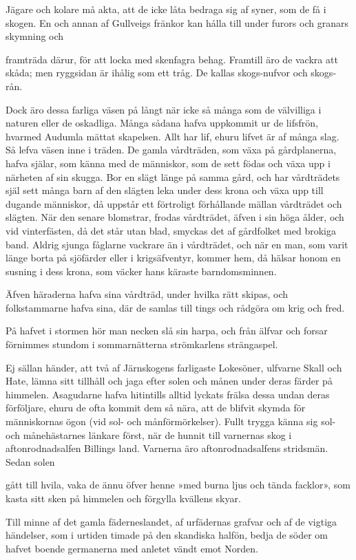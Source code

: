 Jägare och kolare må akta, att de icke låta bedraga sig af syner, som de
få i skogen. En och annan af Gullveigs fränkor kan hålla till under
furors och granars skymning och

framträda därur, för att locka med skenfagra behag. Framtill äro de
vackra att skåda; men ryggsidan är ihålig som ett tråg. De kallas
skogs-nufvor och skogs-rån.

Dock äro dessa farliga väsen på långt när icke så många som de
välvilliga i naturen eller de oskadliga. Många sådana hafva uppkommit ur
de lifsfrön, hvarmed Audumla mättat skapelsen. Allt har lif, ehuru
lifvet är af många slag. Så lefva väsen inne i träden. De gamla
vårdträden, som växa på gårdplanerna, hafva själar, som känna med de
människor, som de sett födas och växa upp i närheten af sin skugga. Bor
en slägt länge på samma gård, och har vårdträdets själ sett många barn
af den slägten leka under dess krona och växa upp till dugande
människor, då uppstår ett förtroligt förhållande mällan vårdträdet och
slägten. När den senare blomstrar, frodas vårdträdet, äfven i sin höga
ålder, och vid vinterfästen, då det står utan blad, smyckas det af
gårdfolket med brokiga band. Aldrig sjunga fåglarne vackrare än i
vårdträdet, och när en man, som varit länge borta på sjöfärder eller i
krigsäfventyr, kommer hem, då hälsar honom en susning i dess krona, som
väcker hans käraste barndomsminnen.

Äfven häraderna hafva sina vårdträd, under hvilka rätt skipas, och
folkstammarne hafva sina, där de samlas till tings och rådgöra om krig
och fred.

På hafvet i stormen hör man necken slå sin harpa, och från älfvar och
forsar förnimmes stundom i sommarnätterna strömkarlens strängaspel.

Ej sällan händer, att två af Järnskogens farligaste Lokesöner, ulfvarne
Skall och Hate, lämna sitt tillhåll och jaga efter solen och månen under
deras färder på himmelen. Asagudarne hafva hitintills alltid lyckats
frälsa dessa undan deras förföljare, ehuru de ofta kommit dem så nära,
att de blifvit skymda för människornas ögon (vid sol- och
månförmörkelser). Fullt trygga känna sig sol- och månehästarnes länkare
först, när de hunnit till varnernas skog i aftonrodnadsalfen Billings
land. Varnerna äro aftonrodnadsalfens stridsmän. Sedan solen

gått till hvila, vaka de ännu öfver henne »med burna ljus och tända
facklor», som kasta sitt sken på himmelen och förgylla kvällens skyar.

Till minne af det gamla fäderneslandet, af urfädernas grafvar och af de
vigtiga händelser, som i urtiden timade på den skandiska halfön, bedja
de söder om hafvet boende germanerna med anletet vändt emot Norden.

